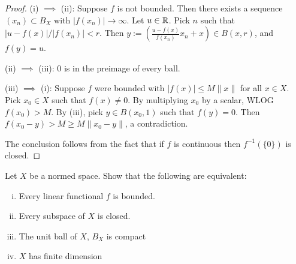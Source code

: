 \documentclass{article}
\begin{document}
\begin{proof}
(i) $\implies$ (ii): Suppose $f$ is not bounded. Then there exists a sequence $(x_n) \subset B_X$ with $|f(x_n)| \to \infty$.  Let $u \in \mathbb{R}$.  Pick $n$ such that $|u - f(x)|/|f(x_n)| < r$.  Then $y := (\frac{u - f(x)}{f(x_n)} x_n + x) \in B(x,r)$, and $f(y) = u$.

(ii) $\implies$ (iii):  $0$ is in the preimage of every ball.

(iii) $\implies$ (i): Suppose $f$ were bounded with $|f(x)| \le M \|x\|$ for all $x \in X$.  Pick $x_0 \in X$ such that $f(x) \neq 0$. By multiplying $x_0$ by a scalar, WLOG $f(x_0) > M$.  By (iii), pick $y \in B(x_0, 1)$ such that $f(y) = 0$.  Then $f(x_0 - y) > M \ge M \|x_0 - y\|$, a contradiction.

The conclusion follows from the fact that if $f$ is continuous then $f^{-1}(\{0\})$ is closed.
\end{proof}


 Let $X$ be a normed space. Show that the following are equivalent:
\begin{enumerate}[(i)]
\item Every linear functional $f$ is bounded.
\item Every subspace of $X$ is closed.
\item The unit ball of $X$, $B_X$ is compact
\item $X$ has finite dimension
\end{enumerate}
\end{document}

